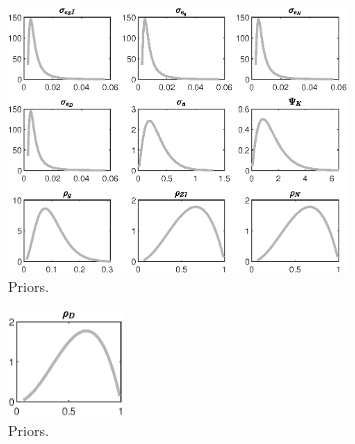  
\begin{figure}[H]
\centering
\includegraphics[width=0.80\textwidth]{BRS_growth_ext_fd_v1/graphs/BRS_growth_ext_fd_v1_Priors1}
\caption{Priors.}\label{Fig:Priors:1}
\end{figure}
\begin{figure}[H]
\centering
\includegraphics[width=0.27\textwidth]{BRS_growth_ext_fd_v1/graphs/BRS_growth_ext_fd_v1_Priors2}
\caption{Priors.}\label{Fig:Priors:2}
\end{figure}
 
